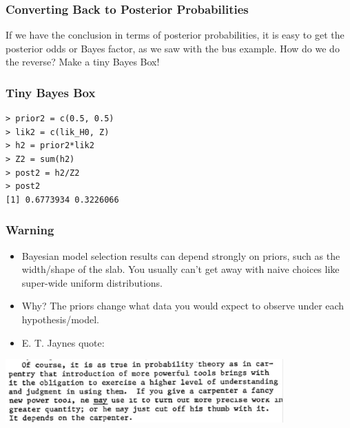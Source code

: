 \documentclass{beamer}
\begin{document}
\begin{frame}[fragile]
\frametitle{Converting Back to Posterior Probabilities}
If we have the conclusion in terms of posterior probabilities, it is easy
to get the posterior odds or Bayes factor, as we saw with the bus example.
How do we do the reverse? Make a tiny Bayes Box!

\end{frame}

\begin{frame}[fragile]
\frametitle{Tiny Bayes Box}

\begin{verbatim}
> prior2 = c(0.5, 0.5)
> lik2 = c(lik_H0, Z)
> h2 = prior2*lik2
> Z2 = sum(h2)
> post2 = h2/Z2
> post2
[1] 0.6773934 0.3226066
\end{verbatim}


\end{frame}

\begin{frame}
\frametitle{Warning}

\begin{itemize}
\item Bayesian model selection results
can depend strongly on priors, such as the width/shape of the slab. You usually
can't get away with naive choices like super-wide uniform distributions.\pause
\item Why? The priors change what data you would expect to observe under each
hypothesis/model.\pause
\item E. T. Jaynes quote:
\end{itemize}

\includegraphics[width=0.8\textwidth]{images/carpenter.png}

\end{frame}
\end{document}
